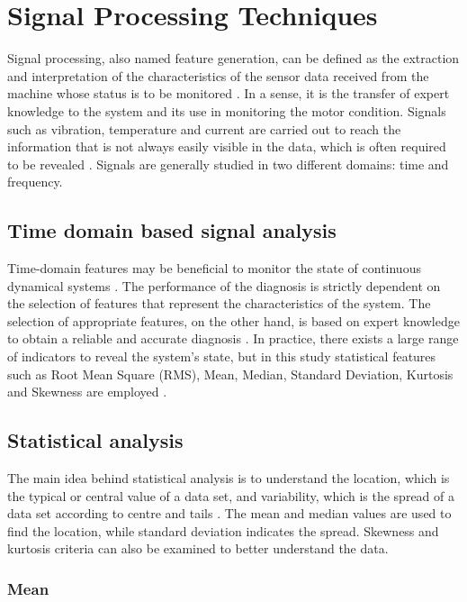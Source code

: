 \section{Signal Processing Techniques}

Signal processing, also named feature generation, can be defined as the extraction and interpretation of the characteristics of the sensor data received from the machine whose status is to be monitored \cite{cernuda2019relevance}. In a sense, it is the transfer of expert knowledge to the system and its use in monitoring the motor condition. Signals such as vibration, temperature and current are carried out to reach the information that is not always easily visible in the data, which is often required to be revealed \cite{bonaldi2012predictive}. Signals are generally studied in two different domains: time and frequency. 

\subsection{Time domain based signal analysis}

Time-domain features may be beneficial to monitor the state of continuous dynamical systems \cite{medjaher2012feature}. The performance of the diagnosis is strictly dependent on the selection of features that represent the characteristics of the system. The selection of appropriate features, on the other hand, is based on expert knowledge to obtain a reliable and accurate diagnosis \cite{soualhi2019health}. In practice, there exists a large range of indicators to reveal the system's state, but in this study statistical features such as Root Mean Square (RMS), Mean, Median, Standard Deviation, Kurtosis and Skewness are employed \cite{shukla2015analysis}.

\subsection{Statistical analysis}

The main idea behind statistical analysis is to understand the location, which is the typical or central value of a data set, and variability, which is the spread of a data set according to centre and tails \cite{croarkin2012handbook}. The mean and median values are used to find the location, while standard deviation indicates the spread. Skewness and kurtosis criteria can also be examined to better understand the data. 

\subsubsection{Mean}

